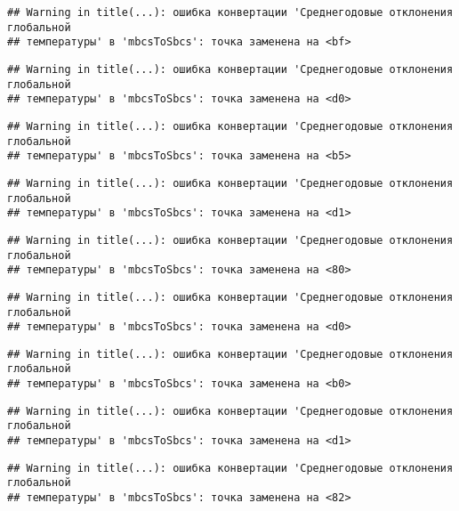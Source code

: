 \documentclass[
]{article}
\begin{document}
\begin{verbatim}
## Warning in title(...): ошибка конвертации 'Среднегодовые отклонения глобальной
## температуры' в 'mbcsToSbcs': точка заменена на <bf>
\end{verbatim}

\begin{verbatim}
## Warning in title(...): ошибка конвертации 'Среднегодовые отклонения глобальной
## температуры' в 'mbcsToSbcs': точка заменена на <d0>
\end{verbatim}

\begin{verbatim}
## Warning in title(...): ошибка конвертации 'Среднегодовые отклонения глобальной
## температуры' в 'mbcsToSbcs': точка заменена на <b5>
\end{verbatim}

\begin{verbatim}
## Warning in title(...): ошибка конвертации 'Среднегодовые отклонения глобальной
## температуры' в 'mbcsToSbcs': точка заменена на <d1>
\end{verbatim}

\begin{verbatim}
## Warning in title(...): ошибка конвертации 'Среднегодовые отклонения глобальной
## температуры' в 'mbcsToSbcs': точка заменена на <80>
\end{verbatim}

\begin{verbatim}
## Warning in title(...): ошибка конвертации 'Среднегодовые отклонения глобальной
## температуры' в 'mbcsToSbcs': точка заменена на <d0>
\end{verbatim}

\begin{verbatim}
## Warning in title(...): ошибка конвертации 'Среднегодовые отклонения глобальной
## температуры' в 'mbcsToSbcs': точка заменена на <b0>
\end{verbatim}

\begin{verbatim}
## Warning in title(...): ошибка конвертации 'Среднегодовые отклонения глобальной
## температуры' в 'mbcsToSbcs': точка заменена на <d1>
\end{verbatim}

\begin{verbatim}
## Warning in title(...): ошибка конвертации 'Среднегодовые отклонения глобальной
## температуры' в 'mbcsToSbcs': точка заменена на <82>
\end{verbatim}
\end{document}
